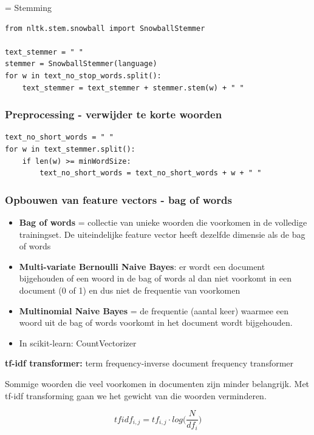 \documentclass{article}
\begin{document}
= Stemming

\begin{verbatim}
from nltk.stem.snowball import SnowballStemmer

text_stemmer = " "
stemmer = SnowballStemmer(language)
for w in text_no_stop_words.split():
    text_stemmer = text_stemmer + stemmer.stem(w) + " "
\end{verbatim}

\subsubsection{Preprocessing - verwijder te korte woorden}

\begin{verbatim}
text_no_short_words = " "
for w in text_stemmer.split():
    if len(w) >= minWordSize:
        text_no_short_words = text_no_short_words + w + " "
\end{verbatim}

\subsubsection{Opbouwen van feature vectors - bag of words}

\begin{itemize}
    \item \textbf{Bag of words} = collectie van unieke woorden die voorkomen in de volledige trainingset. De uiteindelijke feature vector heeft dezelfde dimensie als de bag of words
    \item \textbf{Multi-variate Bernoulli Naive Bayes}: er wordt een document bijgehouden of een woord in de bag of words al dan niet voorkomt in een document (0 of 1) en dus niet de frequentie van voorkomen
    \item \textbf{Multinomial Naive Bayes} = de frequentie (aantal keer) waarmee een woord uit de bag of words voorkomt in het document wordt bijgehouden. 
    \item In scikit-learn: CountVectorizer
\end{itemize}


\textbf{tf-idf transformer:} term frequency-inverse document frequency transformer

Sommige woorden die veel voorkomen in documenten zijn minder belangrijk.
Met tf-idf transforming gaan we het gewicht van die woorden verminderen.

\begin{equation*}
    tfidf_{i,j} = tf_{i,j} \cdot log \Big(\frac{N}{df_i}\Big)
\end{equation*}
\end{document}
